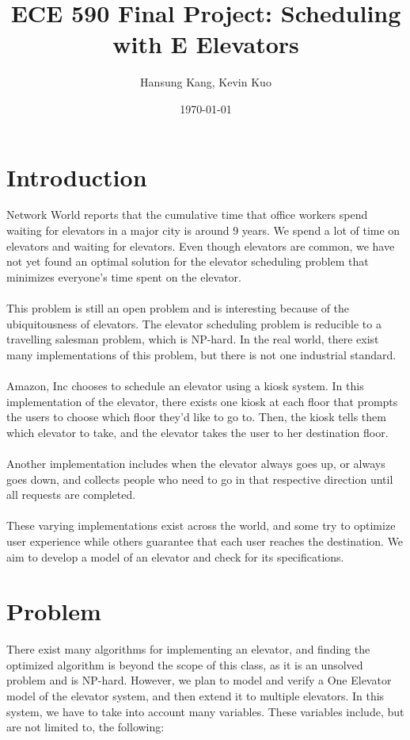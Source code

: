 \documentclass[letterpaper]{article} %
\begin{document}
\title{ECE 590 Final Project: Scheduling with E Elevators}
\author{Hansung Kang, Kevin Kuo}
\date{\today}
\maketitle

\section{Introduction}
Network World reports that the cumulative time that office workers spend waiting for elevators in a major city is around 9 years. We spend a lot of time on elevators and waiting for elevators. Even though elevators are common, we have not yet found an optimal solution for the elevator scheduling problem that minimizes everyone’s time spent on the elevator. \\\\
This problem is still an open problem and is interesting because of the ubiquitousness of elevators. The elevator scheduling problem is reducible to a travelling salesman problem, which is NP-hard. In the real world, there exist many implementations of this problem, but there is not one industrial standard.\\\\
Amazon, Inc chooses to schedule an elevator using a kiosk system. In this implementation of the elevator, there exists one kiosk at each floor that prompts the users to choose which floor they’d like to go to. Then, the kiosk tells them which elevator to take, and the elevator takes the user to her destination floor.\\\\
Another implementation includes when the elevator always goes up, or always goes down, and collects people who need to go in that respective direction until all requests are completed.\\\\
These varying implementations exist across the world, and some try to optimize user experience while others guarantee that each user reaches the destination. We aim to develop a model of an elevator and check for its specifications.

\section{Problem}
There exist many algorithms for implementing an elevator, and finding the optimized algorithm is beyond the scope of this class, as it is an unsolved problem and is NP-hard. However, we plan to model and verify a One Elevator model of the elevator system, and then extend it to multiple elevators. In this system, we have to take into account many variables. These variables include, but are not limited to, the following:
\end{document}

